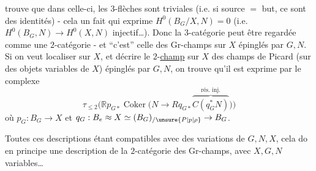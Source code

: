 trouve que dans celle-ci, les $3$-flèches sont triviales (i.e. si source $=$ but, ce sont des identités) - cela un fait qui exprime $H^{0}(B_{G}/X,N)=0$ (i.e. $H^{0}(B_{G},N)\to H^{0}(X,N)$ injectif\ldots). Donc la $3$-catégorie peut être regardée comme une $2$-catégorie - et ``c'est'' celle des Gr-champs sur $X$ épinglés par $G,N$. Si on veut localiser sur $X$, et décrire le $2$-\uline{champ}  sur $X$ des champs de Picard (sur des objets variables de $X$) épinglés par $G,N$, on trouve qu'il est exprime par le complexe
\[
\tau_{\leq 2}\bigl(\mathbb{R}p_{G*}\operatorname{Coker}\bigl(N\to Rq_{G*}\overbrace{C(q_{G}^{*}N)}^{\text{rés. inj.}}\bigr)\bigr)
\]
où $p_{G}:B_{G}\to X$ et $q_{G}:B_{e}\approx X\simeq(B_{G})_{/\unsure{P|p|\rho}}\to B_{G}$.

Toutes ces descriptions étant compatibles avec des variations de $G,N,X$, cela do en principe une description de la $2$-catégorie des Gr-champs, avec $X,G,N$ variables\ldots
